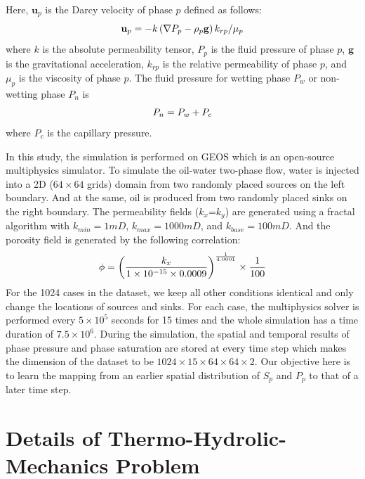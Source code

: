 Here, $\mathbf{u}_p$ is the Darcy velocity of phase $p$ defined as follows:
\begin{equation}
	\mathbf{u}_p = -k \left( \nabla P_p - \rho_p \mathbf{g} \right) k_{rp} / \mu_p \notag
\end{equation}
where $k$ is the absolute permeability tensor, $P_p$ is the fluid pressure of phase $p$, $\mathbf{g}$ is the gravitational acceleration, $k_{rp}$ is the relative permeability of phase $p$, and $\mu_p$ is the viscosity of phase $p$. The fluid pressure for wetting phase $P_w$ or non-wetting phase $P_n$ is 
\begin{equation}
	P_n = P_w + P_c \notag
\end{equation}
where $P_c$ is the capillary pressure.

In this study, the simulation is performed on GEOS which is an open-source multiphysics simulator. To simulate the oil-water two-phase flow, water is injected into a 2D ($64\times64$ grids) domain from two randomly placed sources on the left boundary. And at the same, oil is produced from two randomly placed sinks on the right boundary. The permeability fields ($k_x$=$k_y$) are generated using a fractal algorithm with $k_{min}=1mD$, $k_{max}=1000mD$, and $k_{base}=100mD$. And the porosity field is generated by the following correlation:
\begin{equation}
	\phi = \left( \frac{k_x}{1 \times 10^{-15} \times 0.0009} \right)^{\frac{1}{4.0001}} \times \frac{1}{100} \notag
\end{equation}
For the 1024 cases in the dataset, we keep all other conditions identical and only change the locations of sources and sinks. For each case, the multiphysics solver is performed every $5\times10^5$ seconds for 15 times and the whole simulation has a time duration of $7.5\times10^6$. During the simulation, the spatial and temporal results of phase pressure and phase saturation are stored at every time step which makes the dimension of the dataset to be $1024\times15\times64\times64\times2$. Our objective here is to learn the mapping from an earlier spatial distribution of $S_p$ and $P_{p}$ to that of a later time step.

\newpage
\section{Details of Thermo-Hydrolic-Mechanics Problem}
\label{sec:appx-thm}

